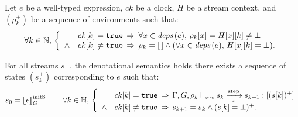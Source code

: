 \begin{lemma}
    \label{lem:semantics:grsync:theorems:equivalence:e}
    Let $e$ be a well-typed \GRSync expression, $ck$ be a clock, $H$ be a stream context, and
    $(\rho_k^+)$ be a sequence of environments such that:
    \begin{equation*}
        \forall k \in \mathbb{N}, \,
        \left\{
        \begin{array}{ll}
                   & ck[k] = \mathtt{{true}} \, \Rightarrow \,
            \forall x \in {\ensuremath{\textit{deps}\left(e\right)}}, \, \rho_k[x] = H[x][k] \neq \bot                \\
            \wedge & ck[k] \neq \mathtt{{true}} \, \Rightarrow \,
            \rho_k = [\,] \wedge (\forall x \in {\ensuremath{\textit{deps}\left(e\right)}}, \,  H[x][k] = \bot). \\
        \end{array}
        \right.
    \end{equation*}

    For all streams $s^+$, the denotational semantics 
    holds \iff there exists a sequence of states $(s_k^+)$ corresponding to $e$ such that:
    \begin{equation*}
        s_0 = \initstate{e} \qquad
        \forall k \in \N, \,
        \left\{
        \begin{array}{ll}
                   & ck[k] = \true \, \Rightarrow \, \exprOpsem{\rho_k}{s_k}{e}{s_{k+1}}{(s[k])^+} \\
            \wedge & ck[k] \neq \true \, \Rightarrow \, s_{k+1} = s_k \wedge (s[k] = \bot)^+.      \\
        \end{array}
        \right.
    \end{equation*}
\end{lemma}
